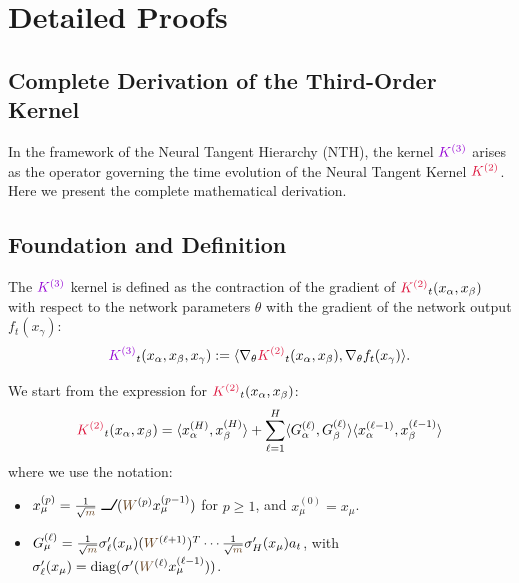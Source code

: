 \documentclass[a4paper]{article}
\newcommand{\W}{\textcolor{weightcolor}{W}}
\newcommand{\m}{\textcolor{weightcolor}{m}}
\DeclareRobustCommand{\ReLU}{\mathrel{\text{%
    \begin{tikzpicture}[baseline=(current bounding box.south)]
        \draw[thick] (0,0) -- (0.25,0) -- (0.4,0.25);
    \end{tikzpicture}}}\!\!}
\theoremstyle{plain}
\theoremstyle{definition}
\theoremstyle{remark}
\begin{document}
\appendix
\section{Detailed Proofs}






\subsection{Complete Derivation of the Third-Order Kernel}\label{sec:appendix_k3_derivation}

In the framework of the Neural Tangent Hierarchy (NTH), the kernel $\textcolor{k3color}{K^{(3)}}$ arises as the operator governing the time evolution of the Neural Tangent Kernel $\textcolor{kernelcolor}{\textcolor{kernelcolor}{K}^{(2)}}$. Here we present the complete mathematical derivation.



\subsection{Foundation and Definition}

The $\textcolor{k3color}{K^{(3)}}$ kernel is defined as the contraction of the gradient of $\textcolor{kernelcolor}{\textcolor{kernelcolor}{K}^{(2)}}_t(x_\alpha, x_\beta)$ with respect to the network parameters $\theta$ with the gradient of the network output $f_t(x_\gamma)$:
\begin{equation}
\textcolor{k3color}{K^{(3)}}_t(x_\alpha, x_\beta, x_\gamma) := \langle \nabla_\theta \textcolor{kernelcolor}{\textcolor{kernelcolor}{K}^{(2)}}_t(x_\alpha, x_\beta), \nabla_\theta f_t(x_\gamma) \rangle.
\end{equation}

 \W e start from the expression for $\textcolor{kernelcolor}{\textcolor{kernelcolor}{K}^{(2)}}_t(x_\alpha, x_\beta)$:
\begin{equation}
\textcolor{kernelcolor}{\textcolor{kernelcolor}{K}^{(2)}}_t(x_\alpha, x_\beta) = \langle x^{(H)}_\alpha, x^{(H)}_\beta \rangle + \sum_{\ell=1}^{H} \langle G^{(\ell)}_\alpha, G^{(\ell)}_\beta \rangle \langle x^{(\ell-1)}_\alpha, x^{(\ell-1)}_\beta \rangle
\end{equation}
where we use the notation:
\begin{itemize}
    \item $x^{(p)}_\mu = \frac{1}{\sqrt{\m}} \ReLU(\W^{(p)} x^{(p-1)}_\mu)$ for $p \ge 1$, and $x^{(0)}_\mu = x_\mu$.
    \item $G^{(\ell)}_\mu = \frac{1}{\sqrt{\m}}\sigma'_\ell(x_\mu) (\W^{(\ell+1)})^T \cdots \frac{1}{\sqrt{\m}}\sigma'_H(x_\mu) a_t$, with $\sigma'_\ell(x_\mu) = \text{diag}(\sigma'(\W^{(\ell)}x^{(\ell-1)}_\mu))$.
\end{itemize}
\end{document}
